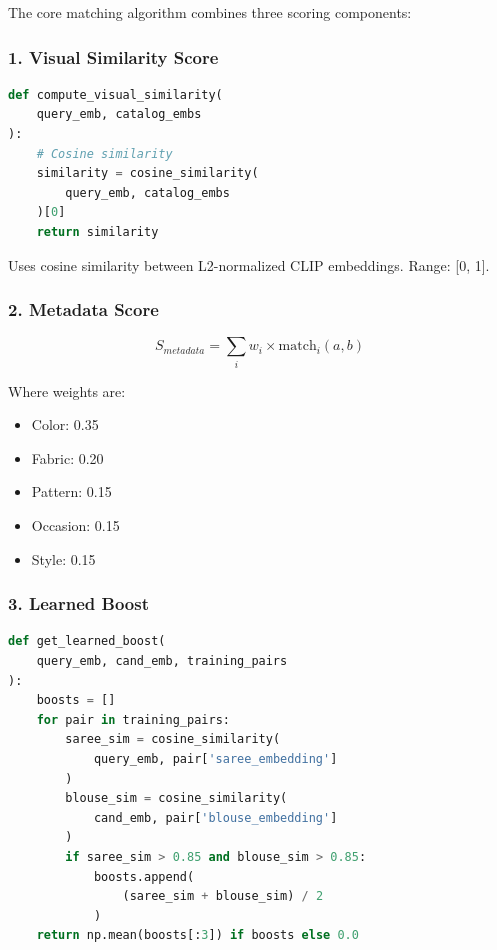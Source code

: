 \documentclass[12pt,a4paper]{report}
\begin{document}
The core matching algorithm combines three scoring components:

\subsubsection{1. Visual Similarity Score}

\begin{lstlisting}[language=Python]
def compute_visual_similarity(
    query_emb, catalog_embs
):
    # Cosine similarity
    similarity = cosine_similarity(
        query_emb, catalog_embs
    )[0]
    return similarity
\end{lstlisting}

Uses cosine similarity between L2-normalized CLIP embeddings. Range: [0, 1].

\subsubsection{2. Metadata Score}

\begin{equation}
S_{metadata} = \sum_{i} w_i \times \text{match}_i(a, b)
\end{equation}

Where weights are:
\begin{itemize}
    \item Color: 0.35
    \item Fabric: 0.20
    \item Pattern: 0.15
    \item Occasion: 0.15
    \item Style: 0.15
\end{itemize}

\subsubsection{3. Learned Boost}

\begin{lstlisting}[language=Python]
def get_learned_boost(
    query_emb, cand_emb, training_pairs
):
    boosts = []
    for pair in training_pairs:
        saree_sim = cosine_similarity(
            query_emb, pair['saree_embedding']
        )
        blouse_sim = cosine_similarity(
            cand_emb, pair['blouse_embedding']
        )
        if saree_sim > 0.85 and blouse_sim > 0.85:
            boosts.append(
                (saree_sim + blouse_sim) / 2
            )
    return np.mean(boosts[:3]) if boosts else 0.0
\end{lstlisting}
\end{document}
